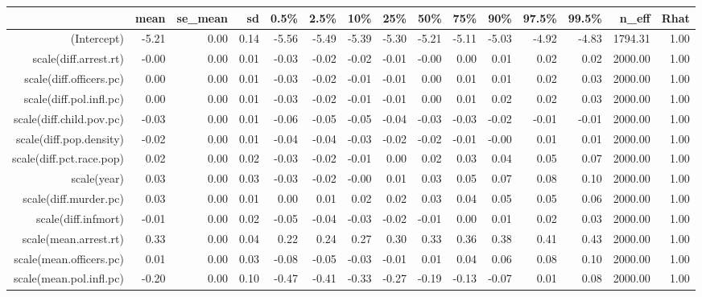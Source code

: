 \begin{table}[ht]
\centering
\begin{tabular}{rrrrrrrrrrrrrrr}
  \hline
 & mean & se\_mean & sd & 0.5\% & 2.5\% & 10\% & 25\% & 50\% & 75\% & 90\% & 97.5\% & 99.5\% & n\_eff & Rhat \\ 
  \hline
(Intercept) & -5.21 & 0.00 & 0.14 & -5.56 & -5.49 & -5.39 & -5.30 & -5.21 & -5.11 & -5.03 & -4.92 & -4.83 & 1794.31 & 1.00 \\ 
  scale(diff.arrest.rt) & -0.00 & 0.00 & 0.01 & -0.03 & -0.02 & -0.02 & -0.01 & -0.00 & 0.00 & 0.01 & 0.02 & 0.02 & 2000.00 & 1.00 \\ 
  scale(diff.officers.pc) & 0.00 & 0.00 & 0.01 & -0.03 & -0.02 & -0.01 & -0.01 & 0.00 & 0.01 & 0.01 & 0.02 & 0.03 & 2000.00 & 1.00 \\ 
  scale(diff.pol.infl.pc) & 0.00 & 0.00 & 0.01 & -0.03 & -0.02 & -0.01 & -0.01 & 0.00 & 0.01 & 0.02 & 0.02 & 0.03 & 2000.00 & 1.00 \\ 
  scale(diff.child.pov.pc) & -0.03 & 0.00 & 0.01 & -0.06 & -0.05 & -0.05 & -0.04 & -0.03 & -0.03 & -0.02 & -0.01 & -0.01 & 2000.00 & 1.00 \\ 
  scale(diff.pop.density) & -0.02 & 0.00 & 0.01 & -0.04 & -0.04 & -0.03 & -0.02 & -0.02 & -0.01 & -0.00 & 0.01 & 0.01 & 2000.00 & 1.00 \\ 
  scale(diff.pct.race.pop) & 0.02 & 0.00 & 0.02 & -0.03 & -0.02 & -0.01 & 0.00 & 0.02 & 0.03 & 0.04 & 0.05 & 0.07 & 2000.00 & 1.00 \\ 
  scale(year) & 0.03 & 0.00 & 0.03 & -0.03 & -0.02 & -0.00 & 0.01 & 0.03 & 0.05 & 0.07 & 0.08 & 0.10 & 2000.00 & 1.00 \\ 
  scale(diff.murder.pc) & 0.03 & 0.00 & 0.01 & 0.00 & 0.01 & 0.02 & 0.02 & 0.03 & 0.04 & 0.05 & 0.05 & 0.06 & 2000.00 & 1.00 \\ 
  scale(diff.infmort) & -0.01 & 0.00 & 0.02 & -0.05 & -0.04 & -0.03 & -0.02 & -0.01 & 0.00 & 0.01 & 0.02 & 0.03 & 2000.00 & 1.00 \\ 
  scale(mean.arrest.rt) & 0.33 & 0.00 & 0.04 & 0.22 & 0.24 & 0.27 & 0.30 & 0.33 & 0.36 & 0.38 & 0.41 & 0.43 & 2000.00 & 1.00 \\ 
  scale(mean.officers.pc) & 0.01 & 0.00 & 0.03 & -0.08 & -0.05 & -0.03 & -0.01 & 0.01 & 0.04 & 0.06 & 0.08 & 0.10 & 2000.00 & 1.00 \\ 
  scale(mean.pol.infl.pc) & -0.20 & 0.00 & 0.10 & -0.47 & -0.41 & -0.33 & -0.27 & -0.19 & -0.13 & -0.07 & 0.01 & 0.08 & 2000.00 & 1.00 \\ 

\end{tabular}
\end{table}
